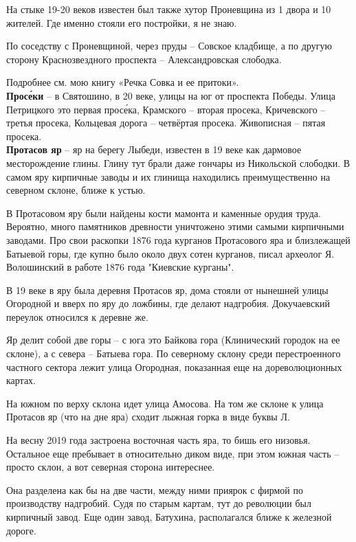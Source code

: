 На стыке 19-20 веков известен был также хутор Проневщина из 1 двора и 10 жителей. Где именно стояли его постройки, я не знаю.

По соседству с Проневщиной, через пруды – Совское кладбище, а по другую сторону Краснозвездного проспекта – Александровская слободка. 

Подробнее см. мою книгу «Речка Совка и ее притоки».\\

\textbf{Прос\'еки} – в Святошино, в 20 веке, улицы на юг от проспекта Победы. Улица Петрицкого это первая прос\'ека, Крамского – вторая просека, Кричевского – третья просека, Кольцевая дорога – четвёртая просека. Живописная – пятая просека.\\

\textbf{Протасов яр} – яр на берегу Лыбеди, известен в 19 веке как дармовое месторождение глины. Глину тут брали даже гончары из Никольской слободки. В самом яру кирпичные заводы и их глинища находились преимущественно на северном склоне, ближе к устью.

В Протасовом яру были найдены кости мамонта и каменные орудия труда. Вероятно, много памятников древности уничтожено этими самыми кирпичными заводами. Про свои раскопки 1876 года курганов Протасового яра и близлежащей Батыевой горы, где купно было около двух сотен курганов, писал археолог Я. Волошинский в работе 1876 года "Киевские курганы".

В 19 веке в яру была деревня Протасов яр, дома стояли от нынешней улицы Огородной и вверх по яру до ложбины, где делают надгробия. Докучаевский переулок относился к деревне же.

Яр делит собой две горы – с юга это Байкова гора (Клинический городок на ее склоне), а с севера – Батыева гора. По северному склону среди перестроенного частного сектора лежит улица Огородная, показанная еще на дореволюционных картах. 

На южном по верху склона идет улица Амосова. На том же склоне к улица Протасов яр (что на дне яра) сходит лыжная горка в виде буквы Л.

На весну 2019 года застроена восточная часть яра, то бишь его низовья. Остальное еще пребывает в относительно диком виде, при этом южная часть – просто склон, а вот северная сторона интереснее.

Она разделена как бы на две части, между ними приярок с фирмой по производству надгробий. Судя по старым картам, тут до революции был кирпичный завод. Еще один завод, Батухина, располагался ближе к железной дороге.


